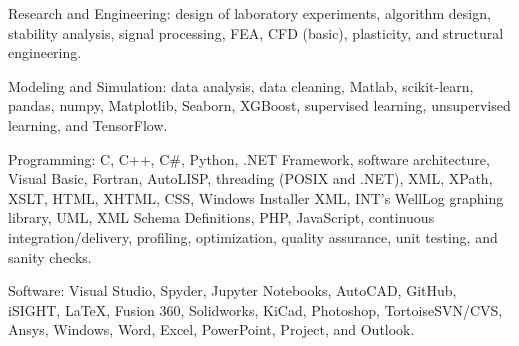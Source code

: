 \documentclass{leresume}
\begin{document}
    \begin{bulletedlist}
		
		\item Research and Engineering: design of laboratory experiments,
                        algorithm design,
                        stability analysis,
                        signal processing,
                        FEA,
                        CFD (basic),
                        plasticity,
                        and structural engineering.
                        
		\item Modeling and Simulation: data analysis,
                        data cleaning,
                        Matlab,
                        scikit-learn,
                        pandas,
                        numpy,
                        Matplotlib,
                        Seaborn,
                        XGBoost,
                        supervised learning,
                        unsupervised learning,
                        and TensorFlow.
                        
		\item Programming: C,
                        C++,
                        C\#,
                        Python,
                        .NET Framework,
                        software architecture,
                        Visual Basic,
                        Fortran,
                        AutoLISP,
                        threading (POSIX and .NET),
                        XML,
                        XPath,
                        XSLT,
                        HTML,
                        XHTML,
                        CSS,
                        Windows Installer XML,
                        INT's WellLog graphing library,
                        UML,
                        XML Schema Definitions,
                        PHP,
                        JavaScript,
                        continuous integration/delivery,
                        profiling,
                        optimization,
                        quality assurance,
                        unit testing,
                        and sanity checks.
                        
		\item Software: Visual Studio,
                        Spyder,
                        Jupyter Notebooks,
                        AutoCAD,
                        GitHub,
                        iSIGHT,
                        LaTeX,
                        Fusion 360,
                        Solidworks,
                        KiCad,
                        Photoshop,
                        TortoiseSVN/CVS,
                        Ansys,
                        Windows,
                        Word,
                        Excel,
                        PowerPoint,
                        Project,
                        and Outlook.
                        

\end{bulletedlist}
\end{document}
